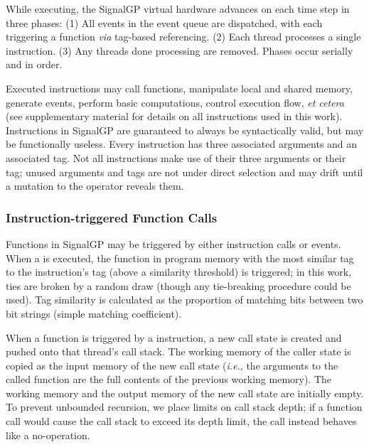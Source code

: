While executing, the SignalGP virtual hardware advances on each time step in three phases: 
(1) All events in the event queue are dispatched, with each triggering a function \textit{via} tag-based referencing. 
(2) Each thread processes a single instruction. 
(3) Any threads done processing are removed.
Phases occur serially and in order. 

Executed instructions may call functions, manipulate local and shared memory, generate events, perform basic computations, control execution flow, \textit{et cetera} (see supplementary material \citep{signalgp_supplement_2018} for details on all instructions used in this work).
Instructions in SignalGP are guaranteed to always be syntactically valid, but may be functionally useless. 
Every instruction has three associated arguments and an associated tag. 
Not all instructions make use of their three arguments or their tag; unused arguments and tags are not under direct selection and may drift until a mutation to the operator reveals them.

\subsubsection{Instruction-triggered Function Calls}

Functions in SignalGP may be triggered by either instruction calls or events.
When a  is executed, the function in program memory with the most similar tag to the  instruction's tag (above a similarity threshold) is triggered; in this work, ties are broken by a random draw (though any tie-breaking procedure could be used).  
Tag similarity is calculated as the proportion of matching bits between two bit strings (simple matching coefficient).  

When a function is triggered by a  instruction, a new call state is created and pushed onto that thread's call stack.
The working memory of the caller state is copied as the input memory of the new call state (\textit{i.e.}, the arguments to the called function are the full contents of the previous working memory). 
The working memory and the output memory of the new call state are initially empty. 
To prevent unbounded recursion, we place limits on call stack depth; if a function call would cause the call stack to exceed its depth limit, the call instead behaves like a no-operation. 

